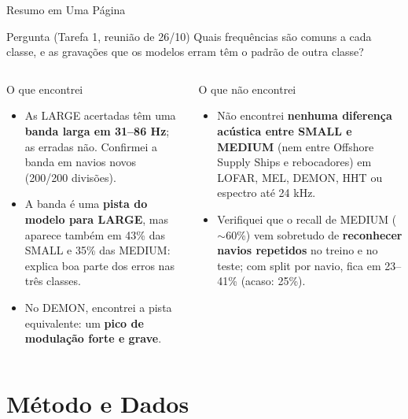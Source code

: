 \documentclass[aspectratio=169]{beamer}
\begin{document}
\begin{frame}{Resumo em Uma Página}
    \footnotesize
    \begin{block}{\small Pergunta (Tarefa 1, reunião de 26/10)}
        \scriptsize
        Quais frequências são comuns a cada classe, e as gravações que os modelos erram têm o padrão de outra classe?
    \end{block}
    \begin{columns}[t]
        \begin{block}{\small O que encontrei}
            \scriptsize
            \begin{itemize}
                \setlength{\itemsep}{1pt}
                \item As LARGE acertadas têm uma \textbf{banda larga em 31--86 Hz}; as erradas não. Confirmei a banda em navios novos (200/200 divisões).
                \item A banda é uma \textbf{pista do modelo para LARGE}, mas aparece também em 43\% das SMALL e 35\% das MEDIUM: explica boa parte dos erros nas três classes.
                \item No DEMON, encontrei a pista equivalente: um \textbf{pico de modulação forte e grave}.
            \end{itemize}
        \end{block}
        \begin{block}{\small O que não encontrei}
            \scriptsize
            \begin{itemize}
                \setlength{\itemsep}{1pt}
                \item Não encontrei \textbf{nenhuma diferença acústica entre SMALL e MEDIUM} (nem entre Offshore Supply Ships e rebocadores) em LOFAR, MEL, DEMON, HHT ou espectro até 24 kHz.
                \item Verifiquei que o recall de MEDIUM ($\sim$60\%) vem sobretudo de \textbf{reconhecer navios repetidos} no treino e no teste; com split por navio, fica em 23--41\% (acaso: 25\%).
            \end{itemize}
        \end{block}
    \end{columns}
\end{frame}

\section{Método e Dados}
\end{document}
